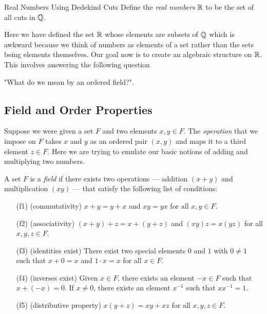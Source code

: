 \begin{definition}{Real Numbers Using Dedekind Cuts}
    Define the \textit{real numbers} \( \mathbb{R}  \) to be the set of all cuts in \( \mathbb{Q}  \).
\end{definition}

Here we have defined the set \( \mathbb{R}  \) whose elements are subsets of \( \mathbb{Q}  \) which is awkward because we think of numbers as elements of a set rather than the sets being elements themselves. Our goal now is to create an algebraic structure on \( \mathbb{R}  \). This involves answering the following question
\begin{center}
    "What do we mean by an ordered field?".
\end{center}

\subsection{Field and Order Properties}

Suppose we were given a set \( F  \) and two elements \( x ,y \in F  \). The \textit{operation} that we impose on \( F  \) takes \( x  \) and \( y  \) as an ordered pair \( (x,y)  \) and maps it to a third element \( z \in F  \). Here we are trying to emulate our basic notions of adding and multiplying two numbers.

\begin{definition}[Field]   A set \( F  \) is a \textit{field} if there exists two operations --- addition \( (x+y)  \) and multiplication \( (xy) \) --- that satisfy the following list of conditions:
   \begin{enumerate}
       \item[(f1)] (commutativity) \( x + y = y + x  \) and \( xy = yx  \) for all \( x,y \in F  \).
       \item[(f2)] (associativity) \( (x+y) + z = x + (y+z)  \) and \( (xy)z = x(yz)    \) for all \( x,y,z \in F  \).
        \item[(f3)] (identities exist) There exist two special elements \( 0  \) and \( 1  \) with \(  0 \neq 1  \) such that \( x + 0 = x  \) and \( 1 \cdot x = x  \) for all \( x \in F  \).
        \item[(f4)] (inverses exist) Given \( x \in F  \), there exists an element \( -x \in F  \) such that \( x + (-x) = 0  \). If \( x \neq 0  \), there exists an element \( x^{-1} \) such that \(  x x^{-1} = 1  \).
        \item[(f5)] (distributive property) \( x(y+z) = xy + xz \) for all \( x,y,z \in F  \).
   \end{enumerate}
\end{definition}

